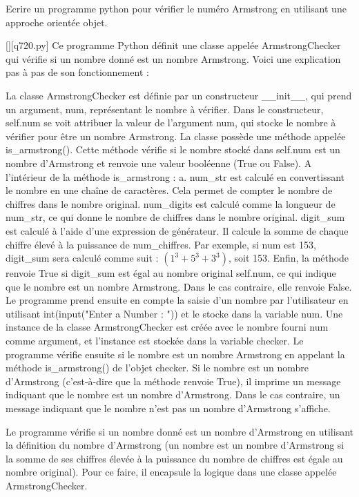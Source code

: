         \question
        Ecrire un programme python pour vérifier le numéro Armstrong en utilisant une approche orientée objet.
        \par
        \begin{solution}
            \renewcommand{\nomfichier}{q720.py}
            \pythonfile{\chemincode \nomfichier}[][\nomfichier]
            Ce programme Python définit une classe appelée ArmstrongChecker qui vérifie si un nombre donné est un nombre Armstrong. Voici une explication pas à pas de son fonctionnement :

    La classe ArmstrongChecker est définie par un constructeur \_\_init\_\_, qui prend un argument, num, représentant le nombre à vérifier.
    Dans le constructeur, self.num se voit attribuer la valeur de l'argument num, qui stocke le nombre à vérifier pour être un nombre Armstrong.
    La classe possède une méthode appelée is\_armstrong(). Cette méthode vérifie si le nombre stocké dans self.num est un nombre d'Armstrong et renvoie une valeur booléenne (True ou False).
    A l'intérieur de la méthode is\_armstrong : a. num\_str est calculé en convertissant le nombre en une chaîne de caractères. Cela permet de compter le nombre de chiffres dans le nombre original.
        num\_digits est calculé comme la longueur de num\_str, ce qui donne le nombre de chiffres dans le nombre original.
        digit\_sum est calculé à l'aide d'une expression de générateur. Il calcule la somme de chaque chiffre élevé à la puissance de num\_chiffres. Par exemple, si num est 153, digit\_sum sera calculé comme suit : $(1^3 + 5^3 + 3^3)$, soit 153.
        Enfin, la méthode renvoie True si digit\_sum est égal au nombre original self.num, ce qui indique que le nombre est un nombre Armstrong. Dans le cas contraire, elle renvoie False.
    Le programme prend ensuite en compte la saisie d'un nombre par l'utilisateur en utilisant int(input("Enter a Number : ")) et le stocke dans la variable num.
    Une instance de la classe ArmstrongChecker est créée avec le nombre fourni num comme argument, et l'instance est stockée dans la variable checker.
    Le programme vérifie ensuite si le nombre est un nombre Armstrong en appelant la méthode is\_armstrong() de l'objet checker.
    Si le nombre est un nombre d'Armstrong (c'est-à-dire que la méthode renvoie True), il imprime un message indiquant que le nombre est un nombre d'Armstrong. Dans le cas contraire, un message indiquant que le nombre n'est pas un nombre d'Armstrong s'affiche.

Le programme vérifie si un nombre donné est un nombre d'Armstrong en utilisant la définition du nombre d'Armstrong (un nombre est un nombre d'Armstrong si la somme de ses chiffres élevée à la puissance du nombre de chiffres est égale au nombre original). Pour ce faire, il encapsule la logique dans une classe appelée ArmstrongChecker.
        \end{solution}
        

